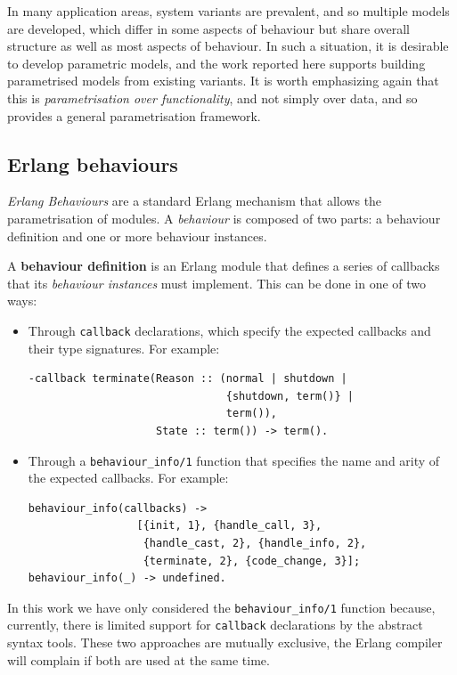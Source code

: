 In many application areas, system variants are prevalent, and so multiple models are developed, which differ in some 
aspects of behaviour but share overall structure as well as most aspects of behaviour. In such a situation, it is 
desirable to develop parametric models, and the work reported here supports building parametrised models from existing 
variants. It is worth emphasizing again that this is \emph{parametrisation over 
functionality}, and not simply over 
data, and so provides a general parametrisation framework.


\subsection{Erlang behaviours\label{sec:erlang_behaviours}}

\emph{Erlang Behaviours} are a standard Erlang mechanism that allows the
parametrisation of modules. A \emph{behaviour} is composed of two parts: a behaviour definition and one or more behaviour instances.


A \textbf{behaviour definition} is an Erlang module that defines a series of callbacks
that its \emph{behaviour instances} must implement. This can be done
in one of two ways:

\begin{itemize}
\item Through \texttt{callback} declarations, which specify the expected
callbacks and their type signatures. For example:
{\small
\begin{verbatim}
-callback terminate(Reason :: (normal | shutdown |
                               {shutdown, term()} |
                               term()),
                    State :: term()) -> term().
\end{verbatim}
}

\item Through a \texttt{behaviour\_info/1} function that specifies the name
and arity of the expected callbacks. For example:
{\small
\begin{verbatim}
behaviour_info(callbacks) ->
                 [{init, 1}, {handle_call, 3},
                  {handle_cast, 2}, {handle_info, 2},
                  {terminate, 2}, {code_change, 3}];
behaviour_info(_) -> undefined.
\end{verbatim}
}
\end{itemize}

In this work we have only considered the \texttt{behaviour\_info/1}
function because, currently, there is limited support for \texttt{callback}
declarations by the abstract syntax tools. These two approaches are
mutually exclusive, the Erlang compiler will complain if both are
used at the same time.

